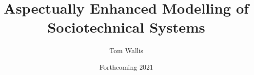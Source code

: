 \title{Aspectually Enhanced Modelling of Sociotechnical Systems}
\author{Tom Wallis}
\date{Forthcoming 2021}

\usepackage[
  backend=biber,
  bibencoding=utf8,
  style=alphabetic,
  natbib=true %
]{biblatex}




\usepackage{caption}
\usepackage{float}
\usepackage{graphicx}
\usepackage{titletoc}
\usepackage{csquotes}
\usepackage{xstring}
\usepackage{calc}
\usepackage{xspace}
\usepackage[export]{adjustbox}


\makeatletter
{}
\makeatother




\usepackage[%
hidealllines=true,
leftline=true,
skipabove=0cm,
skipbelow=0cm,
]{mdframed}
\makeatletter
\renewenvironment*{displayquote}
  {\begingroup\setlength{\leftmargini}{1cm}\csq@getcargs{\csq@bdquote{}{}}}
  {\csq@edquote\endgroup}
\makeatother
\renewcommand{\mkbegdispquote}
    {\bigskip\begin{mdframed}\fontsize{12pt}{12pt}\setstretch{1.25}\setquotestyle{quote}\textooquote}
\renewcommand{\mkenddispquote}{\textcoquote\end{mdframed}\medskip}


